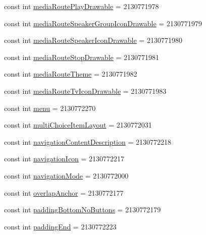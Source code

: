 \begin{CompactItemize}
\item 
const int \hyperlink{class__2doo_1_1_droid_1_1_resource_1_1_attribute_d597887e02f40f6030ab2e16287cca06}{mediaRoutePlayDrawable} = 2130771978
\item 
const int \hyperlink{class__2doo_1_1_droid_1_1_resource_1_1_attribute_000a79dc25fc51473a8c0277de7bb8ef}{mediaRouteSpeakerGroupIconDrawable} = 2130771979
\item 
const int \hyperlink{class__2doo_1_1_droid_1_1_resource_1_1_attribute_f43e487b55dcd2842330b5e2ecb6c47f}{mediaRouteSpeakerIconDrawable} = 2130771980
\item 
const int \hyperlink{class__2doo_1_1_droid_1_1_resource_1_1_attribute_4d53c8cc1068401f8faa49c561e8e1ac}{mediaRouteStopDrawable} = 2130771981
\item 
const int \hyperlink{class__2doo_1_1_droid_1_1_resource_1_1_attribute_d0e0110fb63b8b11436dafaf94e92eb7}{mediaRouteTheme} = 2130771982
\item 
const int \hyperlink{class__2doo_1_1_droid_1_1_resource_1_1_attribute_0b492694d39b79646668411d5081f696}{mediaRouteTvIconDrawable} = 2130771983
\item 
const int \hyperlink{class__2doo_1_1_droid_1_1_resource_1_1_attribute_23a27636bba3e0ec4cf84d2d36ca5ebd}{menu} = 2130772270
\item 
const int \hyperlink{class__2doo_1_1_droid_1_1_resource_1_1_attribute_60b910ff947fe47f253ef3f7672d14b4}{multiChoiceItemLayout} = 2130772031
\item 
const int \hyperlink{class__2doo_1_1_droid_1_1_resource_1_1_attribute_cd34015af816ca708edb975d4b12d50f}{navigationContentDescription} = 2130772218
\item 
const int \hyperlink{class__2doo_1_1_droid_1_1_resource_1_1_attribute_6d1b19ce516a1649bd4b34343e67021c}{navigationIcon} = 2130772217
\item 
const int \hyperlink{class__2doo_1_1_droid_1_1_resource_1_1_attribute_57ad2a56fc84939da3cd86d742e7646d}{navigationMode} = 2130772000
\item 
const int \hyperlink{class__2doo_1_1_droid_1_1_resource_1_1_attribute_1cf897b87985d8d37d821de12b146e15}{overlapAnchor} = 2130772177
\item 
const int \hyperlink{class__2doo_1_1_droid_1_1_resource_1_1_attribute_8fbb5fecae4da1d2bbd382091b4510b1}{paddingBottomNoButtons} = 2130772179
\item 
const int \hyperlink{class__2doo_1_1_droid_1_1_resource_1_1_attribute_3e14e1dad106d73516726f0b5de7845f}{paddingEnd} = 2130772223
\item 

\end{CompactItemize}
